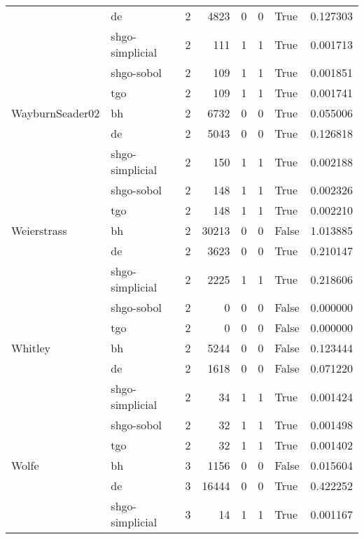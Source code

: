 \begin{longtable}{llrrrrlr}
         & de &     2 &     4823 &      0 &       0 &    True &    0.127303 \\
         & shgo-simplicial &     2 &      111 &      1 &       1 &    True &    0.001713 \\
         & shgo-sobol &     2 &      109 &      1 &       1 &    True &    0.001851 \\
         & tgo &     2 &      109 &      1 &       1 &    True &    0.001741 \\
WayburnSeader02 & bh &     2 &     6732 &      0 &       0 &    True &    0.055006 \\
         & de &     2 &     5043 &      0 &       0 &    True &    0.126818 \\
         & shgo-simplicial &     2 &      150 &      1 &       1 &    True &    0.002188 \\
         & shgo-sobol &     2 &      148 &      1 &       1 &    True &    0.002326 \\
         & tgo &     2 &      148 &      1 &       1 &    True &    0.002210 \\
Weierstrass & bh &     2 &    30213 &      0 &       0 &   False &    1.013885 \\
         & de &     2 &     3623 &      0 &       0 &    True &    0.210147 \\
         & shgo-simplicial &     2 &     2225 &      1 &       1 &    True &    0.218606 \\
         & shgo-sobol &     2 &        0 &      0 &       0 &   False &    0.000000 \\
         & tgo &     2 &        0 &      0 &       0 &   False &    0.000000 \\
Whitley & bh &     2 &     5244 &      0 &       0 &   False &    0.123444 \\
         & de &     2 &     1618 &      0 &       0 &   False &    0.071220 \\
         & shgo-simplicial &     2 &       34 &      1 &       1 &    True &    0.001424 \\
         & shgo-sobol &     2 &       32 &      1 &       1 &    True &    0.001498 \\
         & tgo &     2 &       32 &      1 &       1 &    True &    0.001402 \\
Wolfe & bh &     3 &     1156 &      0 &       0 &   False &    0.015604 \\
         & de &     3 &    16444 &      0 &       0 &    True &    0.422252 \\
         & shgo-simplicial &     3 &       14 &      1 &       1 &    True &    0.001167 \\

\end{longtable}
